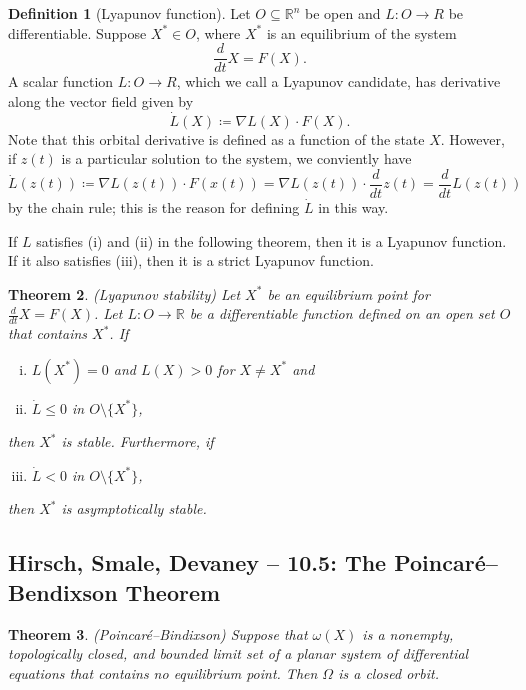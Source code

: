 \documentclass{tufte-handout}
\newcommand*\R{\mathbb{R}}
\newtheorem{thm}{Theorem}[subsection]
\theoremstyle{definition}
\newtheorem{defn}[thm]{Definition}
\begin{document}
\begin{defn}[Lyapunov function]
	Let $O \subseteq \R^n$ be open and $L: O \to R$ be differentiable. Suppose $X^* \in O$, where $X^*$ is an equilibrium of the system \[
		\frac{d}{dt}X = F(X)
	.\]
	A scalar function $L: O \to R$, which we call a Lyapunov candidate, has derivative along the vector field given by \[
		\dot{L}(X) \coloneqq \nabla L(X) \cdot F(X)
	.\] Note that this orbital derivative is defined as a function of the state $X$. However, if $z(t)$ is a particular solution to the system, we conviently have \[
		\dot{L}(z(t)) \coloneqq \nabla L(z(t)) \cdot F(x(t)) = \nabla L(z(t)) \cdot \frac{d}{dt} z(t) = \frac{d}{dt} L(z(t))
	\] by the chain rule; this is the reason for defining $\dot{L}$ in this way.

	If $L$ satisfies (i) and (ii) in the following theorem, then it is a Lyapunov function. If it also satisfies (iii), then it is a strict Lyapunov function.
\end{defn}

\begin{thm}
	(Lyapunov stability) Let $X^*$ be an equilibrium point for $\frac{d}{dt}X = F(X)$. Let $L:O \to \R$ be a differentiable function defined on an open set $O$ that contains $X^*$. If 
	\begin{enumerate}[(i)]
		\item $L(X^*) = 0$ and $L(X) > 0$ for $X \ne X^*$ and
		\item $\dot{L} \le 0$ in $O \setminus \{X^*\}$,
	\end{enumerate}
	then $X^* $ is stable. Furthermore, if 
	\begin{enumerate}[(i)]
		\setcounter{enumi}{2}
		\item $\dot{L} < 0$ in $O \setminus \{X^*\}$,
	\end{enumerate}
	then $X^*$ is asymptotically stable.
\end{thm}

\subsection{Hirsch, Smale, Devaney -- 10.5: The Poincar\'e--Bendixson Theorem}
\begin{thm}
	(Poincar\'e--Bindixson) Suppose that $\omega(X)$ is a nonempty, topologically closed, and bounded limit set of a planar system of differential equations that contains no equilibrium point. Then $\Omega$ is a closed orbit.
\end{thm}
\end{document}
